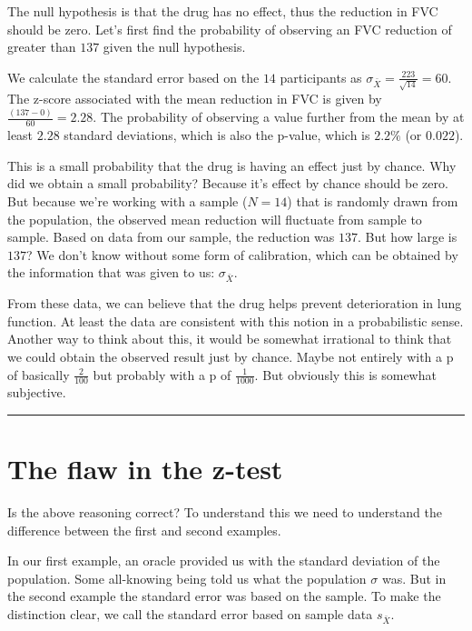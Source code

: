 \documentclass[]{book}
\begin{document}
The null hypothesis is that the drug has no effect, thus the reduction
in FVC should be zero. Let's first find the probability of observing an
FVC reduction of greater than \(137\) given the null hypothesis.

We calculate the standard error based on the \(14\) participants as
\(\sigma_{\bar{X}} = \frac{223}{\sqrt{14}} = 60.\) The z-score
associated with the mean reduction in FVC is given by
\(\frac{(137 - 0)}{60} = 2.28\). The probability of observing a value
further from the mean by at least \(2.28\) standard deviations, which is
also the p-value, which is \(2.2\%\) (or \(0.022\)).

This is a small probability that the drug is having an effect just by
chance. Why did we obtain a small probability? Because it's effect by
chance should be zero. But because we're working with a sample
(\(N=14\)) that is randomly drawn from the population, the observed mean
reduction will fluctuate from sample to sample. Based on data from our
sample, the reduction was \(137\). But how large is \(137\)? We don't
know without some form of calibration, which can be obtained by the
information that was given to us: \(\sigma_{\bar{X}}\).

From these data, we can believe that the drug helps prevent
deterioration in lung function. At least the data are consistent with
this notion in a probabilistic sense. Another way to think about this,
it would be somewhat irrational to think that we could obtain the
observed result just by chance. Maybe not entirely with a p of basically
\(\frac{2}{100}\) but probably with a p of \(\frac{1}{1000}\). But
obviously this is somewhat subjective.

\begin{center}\rule{0.5\linewidth}{\linethickness}\end{center}

\section{The flaw in the z-test}\label{the-flaw-in-the-z-test}

Is the above reasoning correct? To understand this we need to understand
the difference between the first and second examples.

In our first example, an oracle provided us with the standard deviation
of the population. Some all-knowing being told us what the population
\(\sigma\) was. But in the second example the standard error was based
on the sample. To make the distinction clear, we call the standard error
based on sample data \(s_{\bar{X}}\).
\end{document}
